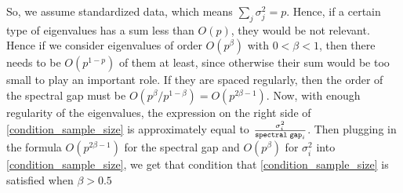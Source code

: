 \documentclass[12pt]{amsart}
\theoremstyle{definition}
\numberwithin{equation}{section}
\numberwithin{equation}{section}
\theoremstyle{remark}
\numberwithin{equation}{section}
\begin{document}
So, we assume standardized data, which means $\sum_j\sigma^2_j=p$.
Hence, if a certain type of eigenvalues has a sum less than $O(p)$,
they would be not relevant. Hence if we consider eigenvalues of order $O(p^\beta)$ with $0<\beta<1$, then there needs to be $O(p^{1-p})$ of them at least, since otherwise their sum would be too small
to play an important role. If they are spaced regularly, then the order of the spectral gap must be $O(p^\beta/p^{1-\beta})=O(p^{2\beta-1})$.
Now, with enough regularity of the eigenvalues, the expression on the right side of \ref{condition_sample_size} is approximately equal to $\frac{\sigma_i^2}{{\tt spectral \; gap}_i}$. Then plugging in the formula $O(p^{2\beta-1})$ for the spectral gap and $O(p^\beta)$ for   $\sigma_i^2$ into \ref{condition_sample_size}, we get that condition
that \ref{condition_sample_size} is satisfied when $\beta>0.5$
\end{document}
